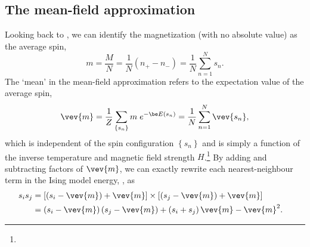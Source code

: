 \subsection{\label{sec:mean_field}The mean-field approximation}
Looking back to , we can identify the magnetization (with no absolute value) as the average spin,
\begin{equation*}
  m = \frac{M}{N} = \frac{1}{N}\left(n_+ - n_-\right) = \frac{1}{N} \sum_{n = 1}^N s_n.
\end{equation*}
The `mean' in the mean-field approximation refers to the expectation value of the average spin,
\begin{equation*}
  \vev{m} = \frac{1}{Z} \sum_{\left\{s_n\right\}} m \; e^{-\be E(s_n)} = \frac{1}{N} \sum_{n = 1}^N \vev{s_n},
\end{equation*}
which is independent of the spin configuration $\left\{s_n\right\}$ and is simply a function of the inverse temperature \be and magnetic field strength $H$.\footnote{}
By adding and subtracting factors of $\vev{m}$, we can exactly rewrite each nearest-neighbour term in the Ising model energy, , as
\begin{align}
  s_i s_j & = \left[\left(s_i - \vev{m}\right) + \vev{m}\right] \times \left[\left(s_j - \vev{m}\right) + \vev{m}\right] \cr
          & = \left(s_i - \vev{m}\right) \left(s_j - \vev{m}\right) + \left(s_i + s_j\right)\vev{m} - \vev{m}^2. \label{eq:MF_start}
\end{align}

